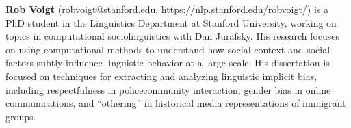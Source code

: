   {\bfseries Rob Voigt} (robvoigt@stanford.edu, https://nlp.stanford.edu/robvoigt/) is a PhD student in the Linguistics Department at Stanford University, working on topics in computational sociolinguistics with Dan Jurafsky. His research focuses on using computational methods to understand how social context and social factors subtly influence linguistic behavior at a large scale. His dissertation is focused on techniques for extracting and analyzing linguistic implicit bias, including respectfulness in police­community interaction, gender bias in online communications, and “othering” in historical media representations of immigrant groups.

    

  
